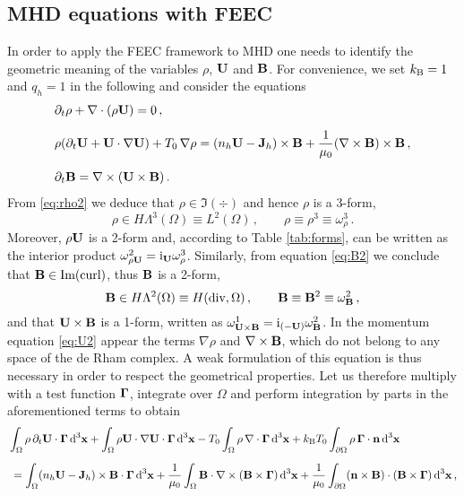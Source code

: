 \documentclass[11pt]{amsart}
\begin{document}
\subsection{MHD equations with FEEC}
In order to apply the FEEC framework to MHD one needs 
to identify the geometric meaning of the variables $\rho$, $\mathbf{U}$ and $\mathbf{B}$. For convenience, we set 
$k_\textnormal{B} = 1$ and $q_h=1$ in the following and consider the equations
\begin{subequations} \label{sys:MHD}
\begin{align}
&\partial_t \rho + \nabla \cdot (\rho \mathbf{U}) = 0\,, \label{eq:rho2}
 \\[2mm]
 &\rho ( \partial_t \mathbf{U} + \mathbf{U} \cdot \nabla \mathbf{U}) + T_0\,\nabla \rho = ( 
n_h \mathbf{U} - 
\mathbf{J}_h) \times \mathbf{B} +
\frac{1}{\mu_0}(\nabla \times \mathbf{B}) \times \mathbf{B} \,,  \label{eq:U2}
 \\[2mm]
 & \partial_t \mathbf{B} = \nabla \times (\mathbf{U} \times \mathbf{B})\,.  \label{eq:B2}
\end{align}
\end{subequations}
From \eqref{eq:rho2} we deduce that $\rho \in \Im(\div)$ and hence $\rho$ is a 3-form,
$$
\rho \in H\Lambda^3(\Omega) \equiv L^2(\Omega)\,,\qquad \rho \equiv \rho^3 \equiv \omega^3_\rho\,.
$$
Moreover, $\rho\mathbf{U}$ is a 2-form and, according to Table \ref{tab:forms}, can be written as the 
interior product $\omega^2_{\rho \mathbf{U}} = \textnormal i_{\mathbf{U}} \omega^3_\rho$.
Similarly, from equation \eqref{eq:B2} we conclude that $\mathbf{B} \in \textnormal{Im}(\textnormal{curl})$, thus $\mathbf{B}$ is a 
2-form,
$$
 \mathbf{B} \in H \Lambda^2(\Omega) \equiv H(\textnormal{div},\Omega)\,,\qquad \mathbf{B} \equiv \mathbf{B}^2 \equiv \omega^2_{\mathbf{B}}\,,
$$
and that $\mathbf{U} \times \mathbf{B}$ is a 1-form, written as $\omega^1_{\mathbf{U} \times \mathbf{B}} = \textnormal i_{(-\mathbf{U})} 
\omega^2_{\mathbf{B}}$. In the momentum equation \eqref{eq:U2} appear the terms $\nabla \rho$ and $\nabla 
\times \mathbf{B}$, which do not belong to any space of the de Rham complex. A weak formulation of this 
equation is thus necessary in order to respect the geometrical properties. Let us therefore 
multiply with a test function $\boldsymbol{\Gamma}$, integrate over $\Omega$ and perform 
integration by parts in the aforementioned terms to obtain
\begin{align}
 &\int_\Omega \rho\, \partial_t \mathbf{U} \cdot \boldsymbol{\Gamma}\,\textnormal d^3\mathbf{x} + \int_\Omega \rho\mathbf{U} \cdot \nabla \mathbf{U} \cdot 
\boldsymbol{\Gamma}\, \textnormal d^3\mathbf{x} - T_0 \int_\Omega \rho\,\nabla \cdot \boldsymbol{\Gamma}\, \textnormal d^3 \mathbf{x} + 
k_\textnormal{B}T_0 \int_{\partial \Omega} \rho\,\boldsymbol{\Gamma} \cdot \mathbf{n}\,\textnormal d^3\mathbf{x}   \label{U:weak}
 \\[2mm]
 &\: = \int_\Omega (n_h \mathbf{U} - \mathbf{J}_h) \times \mathbf{B} \cdot \boldsymbol{\Gamma}\, \textnormal d^3\mathbf{x} + 
\frac{1}{\mu_0} \int_\Omega  \mathbf{B} \cdot \nabla \times (\mathbf{B} \times \boldsymbol{\Gamma})\, \textnormal d^3 \mathbf{x} + 
\frac{1}{\mu_0} \int_{\partial\Omega} (\mathbf{n} \times \mathbf{B}) \cdot (\mathbf{B} \times \boldsymbol{\Gamma})\, \textnormal d^3\mathbf{x} \,,  
\nonumber
\end{align}
\end{document}
